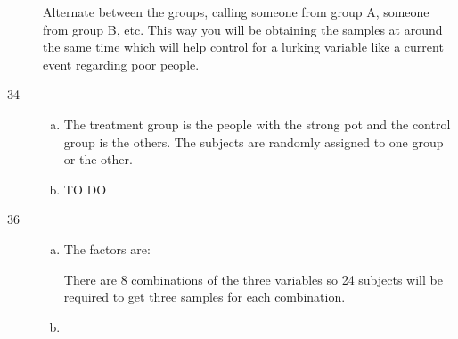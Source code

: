\documentclass[letterpaper]{exam}
\begin{document}
\begin{description}
        Alternate between the groups, calling someone from group A, someone from
        group B, etc. This way you will be obtaining the samples at around the
        same time which will help control for a lurking variable like a current
        event regarding poor people.
        
      \item[34]
        \begin{enumerate}[(a)]
          \item The treatment group is the people with the strong pot and the
            control group is the others.  The subjects are randomly assigned to
            one group or the other.

          \item TO DO
        \end{enumerate}

      \item[36]
        \begin{enumerate}[(a)]
          \item The factors are:

           There are 8 combinations of the three variables so 24 subjects
           will be required to get three samples for each combination.

          \item 
        \end{enumerate}


\end{description}
\end{document}
